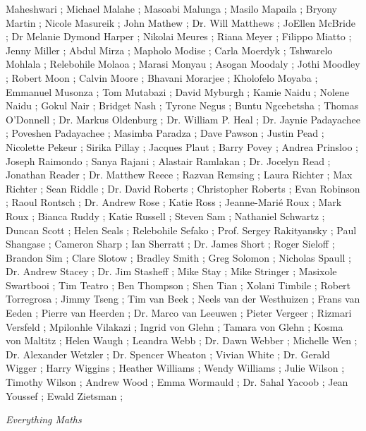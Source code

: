 Maheshwari ; Michael Malahe ; Masoabi Malunga ; Masilo Mapaila ; Bryony Martin ; Nicole Masureik ; John Mathew ; Dr.
Will Matthews ; JoEllen McBride ; Dr Melanie Dymond Harper ; Nikolai Meures ; Riana Meyer ; Filippo Miatto ; Jenny
Miller ; Abdul Mirza ; Mapholo Modise ; Carla Moerdyk ; Tshwarelo Mohlala ; Relebohile Molaoa ; Marasi Monyau ;
Asogan Moodaly ; Jothi Moodley ; Robert Moon ; Calvin Moore ; Bhavani Morarjee ; Kholofelo Moyaba ; Emmanuel
Musonza ; Tom Mutabazi ; David Myburgh ; Kamie Naidu ; Nolene Naidu ; Gokul Nair ; Bridget Nash ; Tyrone Negus ;
Buntu Ngcebetsha ; Thomas O’Donnell ; Dr. Markus Oldenburg ; Dr. William P. Heal ; Dr. Jaynie Padayachee ; Poveshen
Padayachee ; Masimba Paradza ; Dave Pawson ; Justin Pead ; Nicolette Pekeur ; Sirika Pillay ; Jacques Plaut ; Barry
Povey ; Andrea Prinsloo ; Joseph Raimondo ; Sanya Rajani ; Alastair Ramlakan ; Dr. Jocelyn Read ; Jonathan Reader ; Dr.
Matthew Reece ; Razvan Remsing ; Laura Richter ; Max Richter ; Sean Riddle ; Dr. David Roberts ; Christopher Roberts ;
Evan Robinson ; Raoul Rontsch ; Dr. Andrew Rose ; Katie Ross ; Jeanne-Marié Roux ; Mark Roux ; Bianca Ruddy ; Katie
Russell ; Steven Sam ; Nathaniel Schwartz ; Duncan Scott ; Helen Seals ; Relebohile Sefako ; Prof. Sergey Rakityansky ;
Paul Shangase ; Cameron Sharp ; Ian Sherratt ; Dr. James Short ; Roger Sieloff ; Brandon Sim ; Clare Slotow ; Bradley
Smith ; Greg Solomon ; Nicholas Spaull ; Dr. Andrew Stacey ; Dr. Jim Stasheff ; Mike Stay ; Mike Stringer ; Masixole
Swartbooi ; Tim Teatro ; Ben Thompson ; Shen Tian ; Xolani Timbile ; Robert Torregrosa ; Jimmy Tseng ; Tim van Beek ;
Neels van der Westhuizen ; Frans van Eeden ; Pierre van Heerden ; Dr. Marco van Leeuwen ; Pieter Vergeer ; Rizmari
Versfeld ; Mpilonhle Vilakazi ; Ingrid von Glehn ; Tamara von Glehn ; Kosma von Maltitz ; Helen Waugh ; Leandra Webb ;
Dr. Dawn Webber ; Michelle Wen ; Dr. Alexander Wetzler ; Dr. Spencer Wheaton ; Vivian White ; Dr. Gerald Wigger ;
Harry Wiggins ; Heather Williams ; Wendy Williams ; Julie Wilson ; Timothy Wilson ; Andrew Wood ; Emma Wormauld ;
Dr. Sahal Yacoob ; Jean Youssef ; Ewald Zietsman ;








\newpage
\thispagestyle{empty}

{\normalfont\sffamily\fontsize{22}\normalfont\itshape Everything Maths} \par

